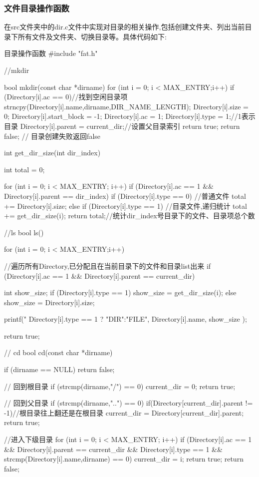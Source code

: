 \subsubsection{文件目录操作函数}
在src文件夹中的dir.c文件中实现对目录的相关操作,包括创建文件夹、列出当前目录下所有文件及文件夹、切换目录等。具体代码如下:
\begin{ccode}{目录操作函数}
#include "fat.h"

//mkdir

bool mkdir(const char *dirname){
    for (int i = 0; i < MAX_ENTRY;i++){
        if (Directory[i].ac == 0)//找到空闲目录项
        {
            strncpy(Directory[i].name,dirname,DIR_NAME_LENGTH);
            Directory[i].size = 0;
            Directory[i].start_block = -1;
            Directory[i].ac = 1;
            Directory[i].type = 1;//1表示目录
            Directory[i].parent = current_dir;//设置父目录索引
            return true;
        }
    }
    return false; // 目录创建失败返回false
}

int get_dir_size(int dir_index){
    int total = 0;
    
    for (int i = 0; i < MAX_ENTRY; i++){
        if (Directory[i].ac == 1 && Directory[i].parent == dir_index){
            if (Directory[i].type == 0){
                //普通文件
                total += Directory[i].size;            
            }else if (Directory[i].type == 1){
                //目录文件,递归统计
                total += get_dir_size(i);
            }
        }
    }
    return total;//统计dir_index号目录下的文件、目录项总个数
}

//ls
bool ls(){
    for (int i = 0; i < MAX_ENTRY;i++){
        //遍历所有Directory,已分配且在当前目录下的文件和目录list出来
        if (Directory[i].ac == 1 && Directory[i].parent == current_dir){
            int show_size;
            if (Directory[i].type == 1){
                show_size = get_dir_size(i);
            }else{
                show_size = Directory[i].size;
            }

            printf("%
            Directory[i].type == 1 ? "DIR":"FILE",
            Directory[i].name,
            show_size
            );
        }
    }
    return true;
}

// cd 
bool cd(const char *dirname){
    if (dirname == NULL) return false;

    // 回到根目录
    if (strcmp(dirname,"/") == 0){
        current_dir = 0;
        return true;
    }
    
    // 回到父目录
    if (strcmp(dirname,"..") == 0){
        if(Directory[current_dir].parent != -1){//根目录往上翻还是在根目录
            current_dir = Directory[current_dir].parent;
        }
        return true;
    }
    

    //进入下级目录
    for (int i = 0; i < MAX_ENTRY; i++){
        if (Directory[i].ac == 1 && Directory[i].parent == current_dir && Directory[i].type == 1 && 
            strcmp(Directory[i].name,dirname) == 0){
                current_dir = i;
                return true;
            }
    }
    return false;
}
\end{ccode}
